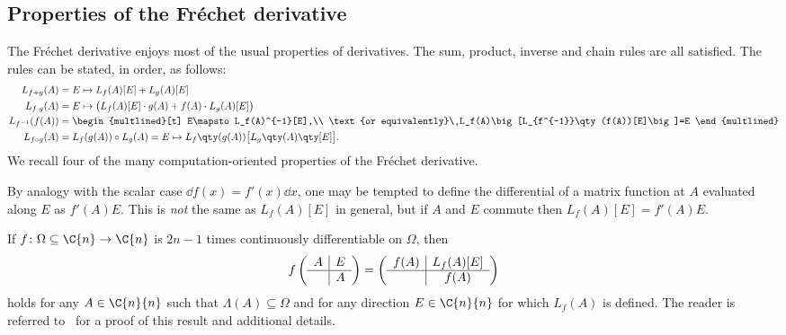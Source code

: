 \subsection{Properties of the Fréchet derivative}\label{subs:frechet_properties}
The Fréchet derivative enjoys most of the usual properties of derivatives. The sum, product, inverse and chain rules are all satisfied. The rules can be stated, in order, as follows:
\begin{subequations}\label{eqn:frechet_rules}
\begin{align}
	L_{f+g}(A) & = E\mapsto L_f(A)[E] + L_g(A)[E]\nonumber \\
	L_{f\cdot g}(A) & = E\mapsto\big(L_f(A)[E]\cdot g(A) + f(A)\cdot L_g(A)[E]\big)\label{eqn:frechet_prod_rule}\\
	L_{f^{-1}}(f(A)) & = 
		\begin{multlined}[t]
			E\mapsto L_f(A)^{-1}[E],\\ 
			\text{or equivalently}\ L_f(A)\big[L_{f^{-1}}\qty(f(A))[E]\big]=E
		\end{multlined}\nonumber \\
	L_{f\circ g}(A) & = L_f(g(A))\circ L_g(A) = E\mapsto L_f\qty(g(A))\big[L_g\qty(A)\qty[E]\big].\label{eqn:frechet_chain_rule}
\end{align}
\end{subequations}
\noindent We recall four of the many computation-oriented properties of the Fréchet derivative.

By analogy with the scalar case $\dd f(x)=f'(x)\dd{x}$, one may be tempted to define the differential of a matrix function at $A$ evaluated along $E$ as $f'(A)E$. This is \emph{not} the same as $L_f(A)[E]$ in general, but if $A$ and $E$ commute then $ L_f(A)[E]=f'(A)E$.

If $f\colon\Omega\subseteq\C{n}\to\C{n}$ is $2n-1$ times continuously differentiable on $\Omega$, then 
\begin{equation}\label{eqn:mathias_trick}
	f\left(\begin{array}{c|c}
		A & E \\ \hline & A
	\end{array}\right)=
	\left(\begin{array}{c|c}
		f(A) & L_f(A)[E] \\ \hline & f(A)
	\end{array}\right)
\end{equation}
holds for any $A\in\C{n}{n}$ such that $\Lambda(A)\subseteq\Omega$ and for any direction $E\in\C{n}{n}$ for which $L_f(A)$ is defined. The reader is referred to~\cite[Thm.~3.6]{higham:matfun_book} for a proof of this result and additional details.


